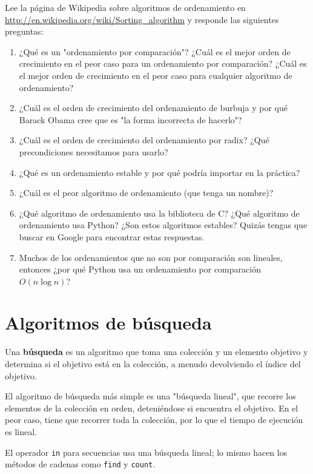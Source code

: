 \begin{exercise}
Lee la página de Wikipedia sobre algoritmos de ordenamiento en \url{http://en.wikipedia.org/wiki/Sorting_algorithm} y responde las siguientes preguntas:

\begin{enumerate}
    \item ¿Qué es un "ordenamiento por comparación"? ¿Cuál es el mejor orden de crecimiento en el peor caso para un ordenamiento por comparación? ¿Cuál es el mejor orden de crecimiento en el peor caso para cualquier algoritmo de ordenamiento?
    \item ¿Cuál es el orden de crecimiento del ordenamiento de burbuja y por qué Barack Obama cree que es "la forma incorrecta de hacerlo"?
    \item ¿Cuál es el orden de crecimiento del ordenamiento por radix? ¿Qué precondiciones necesitamos para usarlo?
    \item ¿Qué es un ordenamiento estable y por qué podría importar en la práctica?
    \item ¿Cuál es el peor algoritmo de ordenamiento (que tenga un nombre)?
    \item ¿Qué algoritmo de ordenamiento usa la biblioteca de C? ¿Qué algoritmo de ordenamiento usa Python? ¿Son estos algoritmos estables? Quizás tengas que buscar en Google para encontrar estas respuestas.
    \item Muchos de los ordenamientos que no son por comparación son lineales, entonces ¿por qué Python usa un ordenamiento por comparación \( O(n \log n) \)?
\end{enumerate}
\end{exercise}

\section{Algoritmos de búsqueda}

Una \textbf{búsqueda} es un algoritmo que toma una colección y un elemento objetivo y determina si el objetivo está en la colección, a menudo devolviendo el índice del objetivo.

El algoritmo de búsqueda más simple es una "búsqueda lineal", que recorre los elementos de la colección en orden, deteniéndose si encuentra el objetivo. En el peor caso, tiene que recorrer toda la colección, por lo que el tiempo de ejecución es lineal.

El operador \texttt{in} para secuencias usa una búsqueda lineal; lo mismo hacen los métodos de cadenas como \texttt{find} y \texttt{count}.


